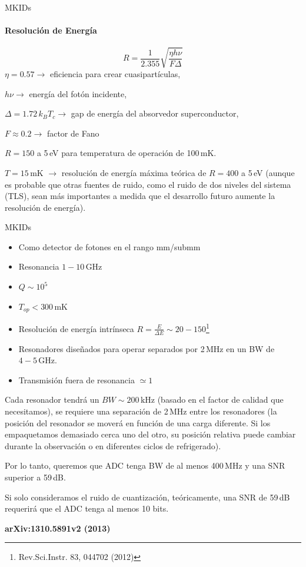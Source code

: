 \documentclass[ignorenonframetext,12pt]{beamer}
\begin{document}
\begin{frame}{MKIDs}
				\framesubtitle{Resolución de Energía}
												\begin{equation*}
																R = \frac{1}{2.355}\sqrt{\frac{\eta h \nu}{F
																\Delta}}
												\end{equation*}
				$\eta = 0.57 \to$ eficiencia para crear cuasipartículas,

				$h\nu \to$ energía del fotón incidente,

				$\Delta = 1.72\,k_BT_c \to$ gap de energía del absorvedor superconductor,

				$F \approx 0.2 \to$ factor de Fano

				$R=150$ a 5\,eV para temperatura de operación de 100\,mK.

				$T = 15$\,mK $\to$ resolución de energía máxima teórica de \alert{$R = 400$ a
				5\,eV} (aunque es probable que otras fuentes de ruido, como el ruido de
				dos niveles del sistema (TLS), sean más importantes a medida que el
				desarrollo futuro aumente	la resolución de energía).

\end{frame}
\begin{frame}{MKIDs}
				\scriptsize{\begin{itemize}
								\item Como detector de fotones en el rango mm/submm
								\item Resonancia  $1-10\,\text{GHz}$
								\item $Q \sim 10^5$
								\item $T_{op} < 300\,\text{mK}$
								\item Resolución de energía intrínseca $R = \frac{E}{\Delta E} \sim
												20-150$\footnote{Rev.Sci.Instr. 83, 044702 (2012)}
								\item Resonadores diseñados para operar separados por 2\,MHz en
												un BW de $4-5\,\text{GHz}$.
								\item Transmisión fuera de resonancia $\simeq 1$
				\end{itemize}
				Cada resonador tendrá un $BW \sim 200\,\text{kHz}$ (\alert{basado en el
				factor de calidad que necesitamos}), se requiere una separación de
				2\,MHz entre los resonadores (la posición del resonador se moverá en
				función de una carga diferente. Si los empaquetamos demasiado cerca uno
				del otro, su posición relativa puede cambiar durante la observación o
				en diferentes ciclos de refrigerado).

				Por lo tanto, queremos que ADC tenga BW de al menos 400\,MHz y una SNR
				superior a 59\,dB.

				Si solo consideramos el ruido de cuantización, teóricamente, una SNR de
				59\,dB requerirá que el ADC tenga al menos 10 bits.
				}
				\tiny{\textbf{arXiv:1310.5891v2 (2013)}}
\end{frame}
\end{document}
